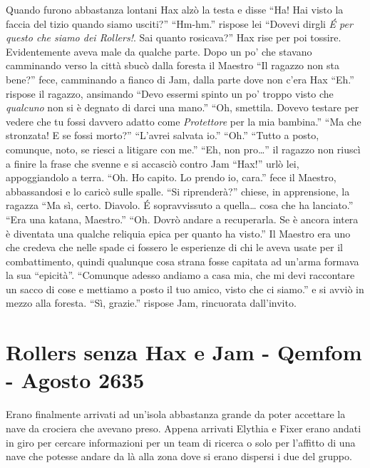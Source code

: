     Quando furono abbastanza lontani Hax alzò la testa e disse ``Ha! Hai
    visto la faccia del tizio quando siamo usciti?'' ``Hm-hm.'' rispose
    lei ``Dovevi dirgli \emph{\'E per questo che siamo dei Rollers!}. Sai
    quanto rosicava?'' Hax rise per poi tossire. Evidentemente aveva male
    da qualche parte. Dopo un po' che stavano camminando verso la città
    sbucò dalla foresta il Maestro ``Il ragazzo non sta bene?'' fece,
    camminando a fianco di Jam, dalla parte dove non c'era Hax ``Eh.''
    rispose il ragazzo, ansimando ``Devo essermi spinto un po' troppo visto
    che \emph{qualcuno} non si è degnato di darci una mano.'' ``Oh,
    smettila. Dovevo testare per vedere che tu fossi davvero adatto come
    \emph{Protettore} per la mia bambina.'' ``Ma che stronzata! E se fossi
    morto?'' ``L'avrei salvata io.'' ``Oh.'' ``Tutto a posto, comunque,
    noto, se riesci a litigare con me.'' ``Eh, non pro\dots{}'' il ragazzo
    non riuscì a finire la frase che svenne e si accasciò contro Jam
    ``Hax!'' urlò lei, appoggiandolo a terra. ``Oh. Ho capito. Lo prendo
    io, cara.'' fece il Maestro, abbassandosi e lo caricò sulle spalle.
    ``Si riprenderà?'' chiese, in apprensione, la ragazza ``Ma sì, certo.
    Diavolo. \'E sopravvissuto a quella\dots{} cosa che ha lanciato.''
    ``Era una katana, Maestro.'' ``Oh. Dovrò andare a recuperarla. Se è
    ancora intera è diventata una qualche reliquia epica per quanto ha
    visto.'' Il Maestro era uno che credeva che nelle spade ci fossero le
    esperienze di chi le aveva usate per il combattimento, quindi qualunque
    cosa strana fosse capitata ad un'arma formava la sua ``epicità''.
    ``Comunque adesso andiamo a casa mia, che mi devi raccontare un sacco
    di cose e mettiamo a posto il tuo amico, visto che ci siamo.'' e si
    avviò in mezzo alla foresta. ``Sì, grazie.'' rispose Jam, rincuorata
    dall'invito.

  \section{Rollers senza Hax e Jam - Qemfom - Agosto 2635}

    Erano finalmente arrivati ad un'isola abbastanza grande da poter
    accettare la nave da crociera che avevano preso. Appena arrivati
    Elythia e Fixer erano andati in giro per cercare informazioni per un
    team di ricerca o solo per l'affitto di una nave che potesse andare da
    là alla zona dove si erano dispersi i due del gruppo.

